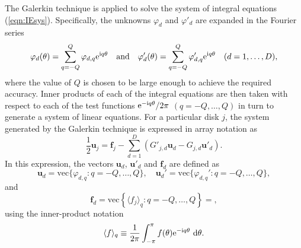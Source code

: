 \documentclass[12pt,a4paper]{article}
\newcommand{\wrt}{ ~ {\rm d}}
\renewcommand{\vec}{\textrm{vec}}
\def\ci{{\mathrm i}}
\renewcommand{\exp}{{\rm e}}
\newcommand{\vpr}{{\varphi}}
\newcommand{\bu}{\textbf{u}}
\newcommand{\bfI}{\textbf{f}}
\newcommand{\force}{f}
\begin{document}
The Galerkin technique is applied to solve the system of integral equations (\ref{eqn:IEsys}).
Specifically, the unknowns $\vpr_{d}$ and $\vpr'_{d}$ are expanded in the Fourier series
\begin{equation}
\vpr_{d}(\theta)
=
\sum_{q=-Q}^{Q}
\vpr_{d,q}
\exp^{\ci q\theta}
\quad
\text{and}
\quad
\vpr'_{d}(\theta)
=
\sum_{q=-Q}^{Q}
\vpr'_{d,q}
\exp^{\ci q\theta}
\quad
(d=1,\dots,D),
\end{equation}
where the value of $Q$ is chosen to be large enough to achieve the required accuracy.
Inner products of each of the integral equations are then taken with respect to each of the test functions 
$\exp^{-\ci q \theta}/2\pi$ $(q=-Q,\dots,Q)$ in turn to generate a system of linear equations.
For a particular disk $j$, the system generated by the Galerkin technique is expressed in array notation as
\begin{equation}\label{eqn:GalSys}
\frac{1}{2}
\bu_{j}
=
\bfI_{j}
-
\sum_{d=1}^{D}
\left(
G'_{j,d}
\bu_{d}
-
G_{j,d}
\bu'_{d}
\right)
.
\end{equation}
In this expression, the vectors $\bu_{d}$, $\bu'_{d}$ and $\bfI_{d}$ are defined as
\begin{equation}
\bu_{d} =  
\vec\{
\vpr_{d,q}
:
q=-Q,\dots,Q\}
,
\quad
\bu_{d}' =  
\vec\{
\vpr_{d,q}'
:
q=-Q,\dots,Q\},
\end{equation}
and
\begin{equation}
\bfI_{d}
=
\vec
\left\{
\langle
\force_{j}
\rangle_{q}
:
q=-Q,\dots,Q
\right\}
=
,
\end{equation}
using the inner-product notation
\begin{equation}
\langle 
f
\rangle_{q}
\equiv
\frac{1}{2\pi}
\int_{-\pi}^{\pi}
f(\theta)\exp^{-\ci q \theta}\wrt\theta.
\end{equation}
\end{document}
